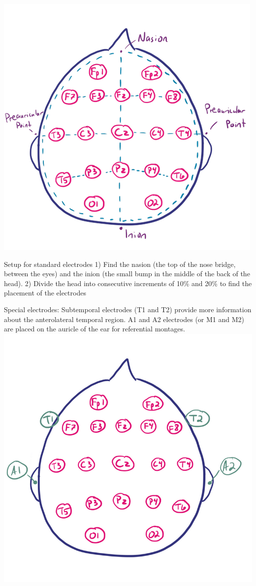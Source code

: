 \documentclass[12pt]{article}
\begin{document}
\includegraphics[scale=0.4]{montage1020system2}

Setup for standard electrodes
1) Find the nasion (the top of the nose bridge, between the eyes) and the inion (the small bump in the middle of the back of the head).
2) Divide the head into consecutive increments of 10\% and 20\% to find the placement of the electrodes

Special electrodes:
Subtemporal electrodes (T1 and T2) provide more information about the anterolateral temporal region.
A1 and A2 electrodes (or M1 and M2) are placed on the auricle of the ear for referential montages.
\includegraphics[scale=0.4]{montage1020system3}
\end{document}
